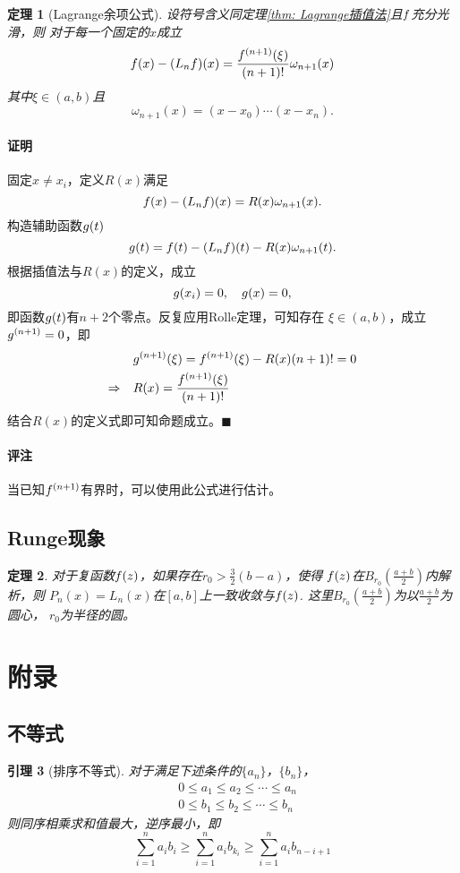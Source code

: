 \documentclass[12pt, a4paper]{article}
\theoremstyle{margin}
\newtheorem{thm}{定理}
\newtheorem{lemma}[thm]{引理}
\newcommand{\f}{\mathnormal{f}}
\newcommand{\g}{\mathnormal{g}}
\newcommand\thmref[1]{定理\ref{#1}}
\newcommand{\remark}{\paragraph{评注}}
\newcommand{\proof}{\paragraph{证明}}
\begin{document}
  \begin{thm}[Lagrange余项公式]
    设符号含义同\thmref{thm: Lagrange插值法}且$\f$充分光滑，则
    对于每一个固定的$x$成立
    \[
      \f(x) - (L_n\f)(x) =
      \frac{\f^{(n+1)}(\xi)}{(n+1)!}\omega_{n+1}(x)
    \]
    其中$\xi\in(a, b)$且
    \[
      \omega_{n+1}(x) = (x-x_0)\cdots(x-x_n).
    \]
  \end{thm}
  \proof
    固定$x\ne x_i$，定义$R(x)$满足
    \[
      \f(x) - (L_n\f)(x) = R(x)\omega_{n+1}(x).
    \]
    构造辅助函数$\g(t)$
    \[
      \g(t) = \f(t) - (L_n\f)(t) - R(x)\omega_{n+1}(t).
    \]
    根据插值法与$R(x)$的定义，成立
    \[
      \g(x_i) = 0,\quad g(x) = 0,
    \]
    即函数$\g(t)$有$n+2$个零点。反复应用Rolle定理，可知存在
    $\xi\in(a, b)$，成立$\g^{(n+1)} = 0$，即
    \[\begin{split}
      & \g^{(n+1)}(\xi) = \f^{(n+1)}(\xi) - R(x)(n+1)! = 0 \\
      \Rightarrow\quad& R(x) = \frac{\f^{(n+1)}(\xi)}{(n+1)!}
    \end{split}\]
    结合$R(x)$的定义式即可知命题成立。$\blacksquare$
  \remark
    当已知$\f^{(n+1)}$有界时，可以使用此公式进行估计。

\subsection{Runge现象}
  \begin{thm}
    对于复函数$\f(z)$，如果存在$r_0>\frac32(b-a)$，使得
    $\f(z)$在$B_{r_0}(\frac{a+b}{2})$内解析，则
    $P_n(x) = L_n(x)$在$[a, b]$上一致收敛与$\f(z)$.
    这里$B_{r_0}(\frac{a+b}{2})$为以$\frac{a+b}{2}$为圆心，
    $r_0$为半径的圆。
  \end{thm}


\newpage
\section{附录}
\subsection{不等式}

  \begin{lemma}[排序不等式]
    \label{lemma: 排序不等式}
    对于满足下述条件的$\{a_n\}$，$\{b_n\}$，
    \[\begin{split}
      & 0 \le a_1\le a_2\le\cdots\le a_n \\
      & 0 \le b_1\le b_2\le\cdots\le b_n
    \end{split}\]
    则同序相乘求和值最大，逆序最小，即
    \[
      \sum_{i=1}^n a_ib_i \ge \sum_{i=1}^n a_ib_{k_i}
      \ge \sum_{i=1}^n a_ib_{n-i+1}
    \]
  \end{lemma}
\end{document}

